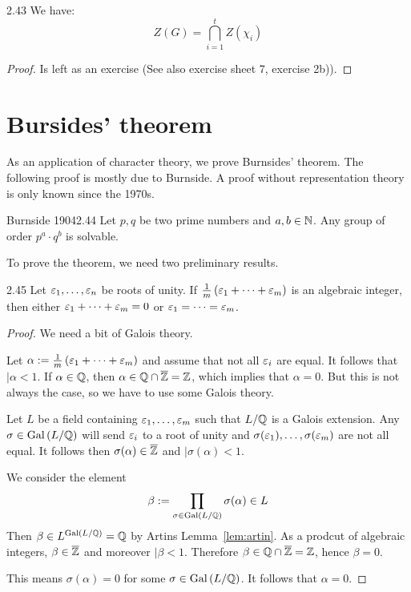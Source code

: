 \documentclass[twoside = false,	%
		headsepline,		%
		parskip = true,
		]{scrbook}						%
\begin{document}
        \begin{proposition}{}{2.43}
            We have:
            $$Z(G)=\bigcap_{i=1}^t Z(\chi_i)$$
        \end{proposition}
        \begin{proof}
            Is left as an exercise (See also exercise sheet 7, exercise 2b)).
        \end{proof}
    
\section{Bursides' theorem}
    As an application of character theory, we prove Burnsides' theorem. The following proof is mostly due to Burnside. A proof without representation theory is only known since the 1970s.
    
    \begin{theorem}{Burnside 1904}{2.44}
        Let $p,q$ be two prime numbers and $a,b \in \mathbb N$. Any group of order $p^a \cdot q^b$ is solvable.
    \end{theorem}

    To prove the theorem, we need two preliminary results.
    
    \begin{lemma}{}{2.45}
        Let $\varepsilon_1,\dots,\varepsilon_n$ be roots of unity. If $\frac{1}{m}\left( \varepsilon_1 + \dots + \varepsilon_m \right)$ is an algebraic integer,
        then either $\varepsilon_1 + \dots + \varepsilon_m = 0$ or $\varepsilon_1 = \dots = \varepsilon_m$.
    \end{lemma}

    \begin{proof}
        We need a bit of Galois theory.

        Let $\alpha:= \frac{1}{m}\left( \varepsilon_1 + \dots + \varepsilon_m \right)$ and assume that not all $\varepsilon_i$ are equal.
        It 
        follows that $\vert{\alpha} < 1$. If $\alpha \in \mathbb Q$, then $\alpha \in \mathbb Q \cap \overline{\mathbb Z} = \mathbb Z$, which implies that $\alpha = 0$.
        But this is not always the case, so we have to use some Galois theory.

        Let $L$ be a field containing $\varepsilon_1,\dots,\varepsilon_m$ such that $L/\mathbb Q$ is a Galois extension. Any $\sigma \in \mathrm{Gal}\left( L/\mathbb Q\right)$ will send $\varepsilon_i$ to a root of unity and
        $\sigma(\varepsilon_1),\dots,\sigma(\varepsilon_m)$ are not all equal. It follows then $\sigma(\alpha) \in \overline{\mathbb Z}$ and $\vert{\sigma(\alpha)} < 1$.

        We consider the element
        \begin{equation*}
            \beta := \prod_{\sigma \in \mathrm{Gal}\left( L/\mathbb Q\right)} \sigma(\alpha) \in L
        \end{equation*}
        Then $\beta \in L^{\mathrm{Gal}\left( L/\mathbb Q\right)} = \mathbb Q $ by Artins Lemma~\ref{lem:artin}. As a prodcut of algebraic integers, $\beta \in \overline{\mathbb Z}$ and moreover $\vert{\beta} < 1$.
        Therefore $\beta \in \mathbb Q \cap \overline{\mathbb Z} = \mathbb Z$, hence $\beta = 0$.

        This means $\sigma(\alpha) = 0$ for some $\sigma \in \mathrm{Gal}\left( L/\mathbb Q\right)$. It follows that $\alpha = 0$.
    \end{proof}
\end{document}

